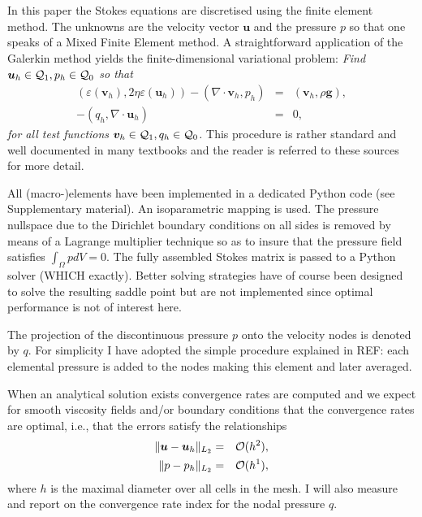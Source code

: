 \documentclass[a4paper]{article}
\begin{document}
In this paper the Stokes equations are discretised using the finite element method.
The unknowns are the velocity vector ${\bm u}$ and the pressure $p$ so that 
one speaks of a Mixed Finite Element method. 
A straightforward application of the Galerkin method yields the finite-dimensional 
variational problem: 
\textit{Find ${\bm u}_h\in {\cal Q}_1,p_h\in {\cal Q}_0$
so that
\begin{eqnarray}
\label{eq:discrete-formulation}
\left(\varepsilon(\bm v_h), 2\eta \varepsilon(\bm u_h)\right)  - ( \nabla \cdot \bm v_h, p_h) &=&   ({\bm v}_h,\rho \bm g),\\
-(q_h,\nabla \cdot \bm u_h) &=& 0,
\end{eqnarray}
for all test functions ${\bm v}_h\in {\cal Q}_1, q_h\in {\cal Q}_0$.}
This procedure is rather standard and well documented in many 
textbooks \cite{grsa,dohu03,bobf13} and the reader is referred to these sources 
for more detail.


All (macro-)elements have been implemented in a dedicated Python code (see Supplementary material). 
An isoparametric mapping is used. 
The pressure nullspace due to the Dirichlet boundary conditions on all sides is removed 
by means of a Lagrange multiplier technique so as to insure that the pressure field 
satisfies $\int_\Omega p dV= 0$.
The fully assembled Stokes matrix is passed to a Python solver (WHICH exactly). 
Better solving strategies have of course 
been designed to solve the resulting saddle point \cite{begl05} but are not 
implemented since optimal performance is not of interest here.

The projection of the discontinuous pressure $p$ onto the velocity nodes is denoted by $q$. 
For simplicity I have adopted the simple procedure explained in REF: each 
elemental pressure is added to the nodes making this element and later averaged. 

When an analytical solution exists convergence rates are computed and 
we expect for smooth viscosity fields and/or boundary conditions that the convergence rates 
are optimal, i.e., that the errors satisfy the relationships
\begin{eqnarray}
\| {\bm u} - {\bm u}_h \|_{L_2} &=&  {\cal O}(h^{2}),     \\  
\| p - p_h \|_{L_2}   &=& {\cal O}(h^{1}),
  \label{eq:error-rates}
\end{eqnarray}
where $h$ is the maximal diameter over all cells in the mesh.
I will also measure and report on the convergence rate index for the nodal pressure $q$.
\end{document}
